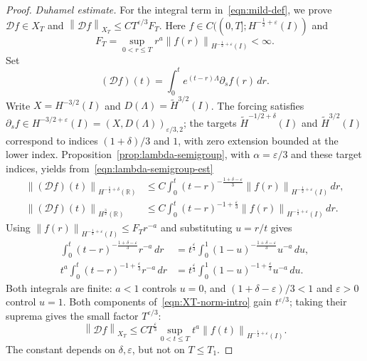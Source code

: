 \documentclass[11pt,reqno]{amsart}
\theoremstyle{plain}
\theoremstyle{definition}
\numberwithin{equation}{section}
\newcommand{\p}{\partial}
\newcommand{\mc}[1]{\mathcal{#1}}
\newcommand{\wt}[1]{\widetilde{#1}}
\newcommand{\norm}[1]{\left\lVert #1 \right\rVert}
\newcommand{\R}{\mathbb{R}}
\newcommand{\hi}[1]{H^{#1}(I)}
\newcommand{\thi}[1]{\wt H^{#1}(I)}
\newcommand{\hr}[1]{H^{#1}(\R)}
\begin{document}
\begin{proof}
\emph{Duhamel estimate.}
For the integral term in~\eqref{eqn:mild-def}, we prove
$\mc Df\in X_T$ and $\norm{\mc Df}_{X_T}\le CT^{\varepsilon/3}F_T$.
Here $f\in C((0,T];\hi{-\frac12+\varepsilon})$ and
\begin{equation*}
    F_T=\sup_{0<r\le T}r^a\norm{f(r)}_{\hi{-\frac12+\varepsilon}}<\infty.
\end{equation*}
Set
\begin{equation}\label{eqn:local-D-definition}
    (\mc Df)(t)
    =\int_0^t e^{(t-r)\Lambda}\p_s f(r)\,dr.
\end{equation}
Write $X=H^{-3/2}(I)$ and $D(\Lambda)=\thi{3/2}$.
The forcing satisfies
$\p_s f\in H^{-3/2+\varepsilon}(I)=(X,D(\Lambda))_{\varepsilon/3,2}$;
the targets $\thi{-1/2+\delta}$ and $\thi{3/2}$ correspond to indices
$(1+\delta)/3$ and $1$, with zero extension bounded at the lower index.
Proposition~\ref{prop:lambda-semigroup}, with $\alpha=\varepsilon/3$
and these target indices, yields from~\eqref{eqn:lambda-semigroup-est}
\begin{equation*}
\begin{aligned}
    \norm{(\mc Df)(t)}_{\hr{-\frac12+\delta}}
    &\le C\int_0^t
    (t-r)^{-\frac{1+\delta-\varepsilon}{3}}
    \norm{f(r)}_{\hi{-\frac12+\varepsilon}}\,dr,\\
    \norm{(\mc Df)(t)}_{\hr{\frac32}}
    &\le C\int_0^t
    (t-r)^{-1+\frac{\varepsilon}{3}}
    \norm{f(r)}_{\hi{-\frac12+\varepsilon}}\,dr.
\end{aligned}
\end{equation*}
Using $\norm{f(r)}_{\hi{-\frac12+\varepsilon}}\le F_T r^{-a}$ and
substituting $u=r/t$ gives
\begin{equation*}
\begin{aligned}
    \int_0^t (t-r)^{-\frac{1+\delta-\varepsilon}{3}}r^{-a}\,dr
    &=t^{\frac{\varepsilon}{3}}
    \int_0^1 (1-u)^{-\frac{1+\delta-\varepsilon}{3}}u^{-a}\,du,\\
    t^a\int_0^t (t-r)^{-1+\frac{\varepsilon}{3}}r^{-a}\,dr
    &=t^{\frac{\varepsilon}{3}}
    \int_0^1 (1-u)^{-1+\frac{\varepsilon}{3}}u^{-a}\,du.
\end{aligned}
\end{equation*}
Both integrals are finite: $a<1$ controls $u=0$, and
$(1+\delta-\varepsilon)/3<1$ and $\varepsilon>0$ control $u=1$.
Both components of~\eqref{eqn:XT-norm-intro} gain $t^{\varepsilon/3}$;
taking their suprema gives the small factor $T^{\varepsilon/3}$:
\begin{equation}\label{eqn:local-duhamel-est}
    \norm{\mc Df}_{X_T}
    \le C T^{\frac{\varepsilon}{3}}
    \sup_{0<t\le T}t^a\norm{f(t)}_{\hi{-\frac12+\varepsilon}}.
\end{equation}
The constant depends on $\delta,\varepsilon$, but not on $T\le T_1$.


\end{proof}
\end{document}
